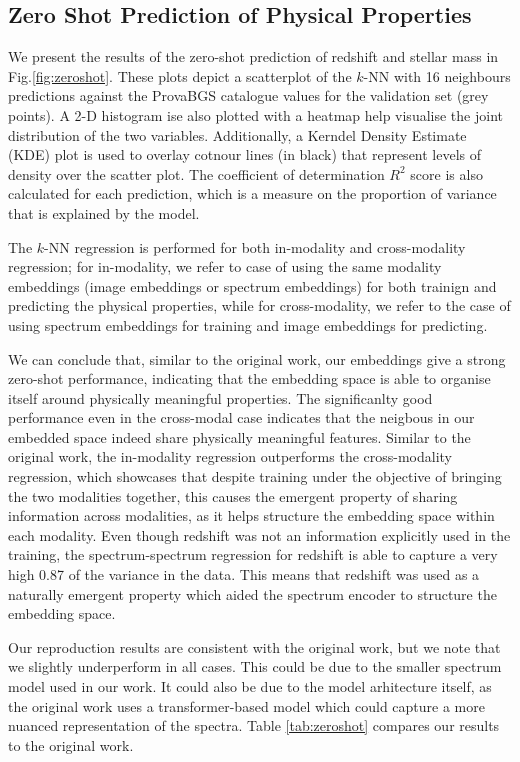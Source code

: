 \documentclass[a4paper,12pt]{article}
\begin{document}
\subsection{Zero Shot Prediction of Physical Properties}
We present the results of the zero-shot prediction of redshift and stellar mass in Fig.\ref{fig:zeroshot}. These plots depict a scatterplot of the $k$-NN with 16 neighbours predictions against the ProvaBGS catalogue values for the validation set (grey points). A 2-D histogram ise also plotted with a heatmap help visualise the joint distribution of the two variables. Additionally, a Kerndel Density Estimate (KDE) plot is used to overlay cotnour lines (in black) that represent levels of density over the scatter plot. The coefficient of determination $R^2$ score is also calculated for each prediction, which is a measure on the proportion of variance that is explained by the model.

The $k$-NN regression is performed for both in-modality and cross-modality regression; for in-modality, we refer to case of using the same modality embeddings (image embeddings or spectrum embeddings) for both trainign and predicting the physical properties, while for cross-modality, we refer to the case of using spectrum embeddings for training and image embeddings for predicting. 

We can conclude that, similar to the original work, our embeddings give a strong zero-shot performance, indicating that the embedding space is able to organise itself around physically meaningful properties. The significanlty good performance even in the cross-modal case indicates that the neigbous in our embedded space indeed share physically meaningful features. Similar to the original work, the in-modality regression outperforms the cross-modality regression, which showcases that despite training under the objective of bringing the two modalities together, this causes the emergent property of sharing information across modalities, as it helps structure the embedding space within each modality. Even though redshift was not an information explicitly used in the training, the spectrum-spectrum regression for redshift is able to capture a very high 0.87 of the variance in the data. This means that redshift was used as a naturally emergent property which aided the spectrum encoder to structure the embedding space.

Our reproduction results are consistent with the original work, but we note that we slightly underperform in all cases. This could be due to the smaller spectrum model used in our work. It could also be due to the model arhitecture itself, as the original work uses a transformer-based model which could capture a more nuanced representation of the spectra. Table \ref{tab:zeroshot} compares our results to the original work.
\end{document}
